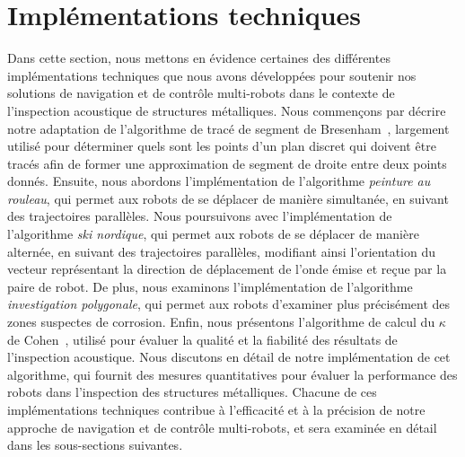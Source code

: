 \documentclass[francais,RandD]{rapportPFE}
\begin{document}
	\section{Implémentations techniques}
		Dans cette section, nous mettons en évidence certaines des différentes implémentations techniques que nous avons développées pour soutenir nos solutions de navigation et de contrôle multi-robots dans le contexte de l'inspection acoustique de structures métalliques.
		Nous commençons par décrire notre adaptation de l'algorithme de tracé de segment de Bresenham~\cite{enwiki:1155124335}, largement utilisé pour déterminer quels sont les points d'un plan discret qui doivent être tracés afin de former une approximation de segment de droite entre deux points donnés.
		Ensuite, nous abordons l'implémentation de l'algorithme \textit{peinture au rouleau}, qui permet aux robots de se déplacer de manière simultanée, en suivant des trajectoires parallèles.
		Nous poursuivons avec l'implémentation de l'algorithme \textit{ski nordique}, qui permet aux robots de se déplacer de manière alternée, en suivant des trajectoires parallèles, modifiant ainsi l'orientation du vecteur représentant la direction de déplacement de l'onde émise et reçue par la paire de robot.
		De plus, nous examinons l'implémentation de l'algorithme \textit{investigation polygonale}, qui permet aux robots d'examiner plus précisément des zones suspectes de corrosion.
		Enfin, nous présentons l'algorithme de calcul du $\kappa$ de Cohen~\cite{enwiki:1130024730}, utilisé pour évaluer la qualité et la fiabilité des résultats de l'inspection acoustique.
		Nous discutons en détail de notre implémentation de cet algorithme, qui fournit des mesures quantitatives pour évaluer la performance des robots dans l'inspection des structures métalliques.
		Chacune de ces implémentations techniques contribue à l'efficacité et à la précision de notre approche de navigation et de contrôle multi-robots, et sera examinée en détail dans les sous-sections suivantes.
\end{document}
